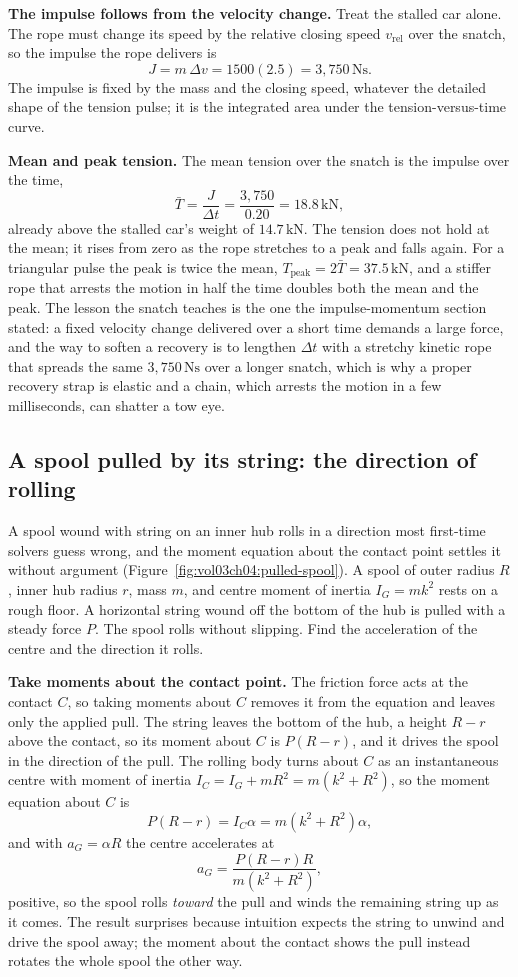 \textbf{The impulse follows from the velocity change.} Treat the stalled
car alone. The rope must change its speed by the relative closing speed
$v_{\text{rel}}$ over the snatch, so the impulse the rope delivers is
\[
J=m\,\Delta v=1500(2.5)=3{,}750\,\si{\newton\second}.
\]
The impulse is fixed by the mass and the closing speed, whatever the
detailed shape of the tension pulse; it is the integrated area under the
tension-versus-time curve.

\textbf{Mean and peak tension.} The mean tension over the snatch is the
impulse over the time,
\[
\bar{T}=\frac{J}{\Delta t}=\frac{3{,}750}{0.20}=18.8\,\si{\kilo\newton},
\]
already above the stalled car's weight of $14.7\,\si{\kilo\newton}$. The
tension does not hold at the mean; it rises from zero as the rope
stretches to a peak and falls again. For a triangular pulse the peak is
twice the mean, $T_{\text{peak}}=2\bar{T}=37.5\,\si{\kilo\newton}$, and a
stiffer rope that arrests the motion in half the time doubles both the
mean and the peak. The lesson the snatch teaches is the one the
impulse-momentum section stated: a fixed velocity change delivered over
a short time demands a large force, and the way to soften a recovery is
to lengthen $\Delta t$ with a stretchy kinetic rope that spreads the same
$3{,}750\,\si{\newton\second}$ over a longer snatch, which is why a
proper recovery strap is elastic and a chain, which arrests the motion in
a few milliseconds, can shatter a tow eye.

\subsection{A spool pulled by its string: the direction of rolling}

A spool wound with string on an inner hub rolls in a direction most
first-time solvers guess wrong, and the moment equation about the
contact point settles it without argument
(Figure~\ref{fig:vol03ch04:pulled-spool}). A spool of outer radius $R$,
inner hub radius $r$, mass $m$, and centre moment of inertia
$I_{G}=mk^{2}$ rests on a rough floor. A horizontal string wound off the
bottom of the hub is pulled with a steady force $P$. The spool rolls
without slipping. Find the acceleration of the centre and the direction
it rolls.

\textbf{Take moments about the contact point.} The friction force acts
at the contact $C$, so taking moments about $C$ removes it from the
equation and leaves only the applied pull. The string leaves the bottom
of the hub, a height $R-r$ above the contact, so its moment about $C$ is
$P(R-r)$, and it drives the spool in the direction of the pull. The
rolling body turns about $C$ as an instantaneous centre with moment of
inertia $I_{C}=I_{G}+mR^{2}=m(k^{2}+R^{2})$, so the moment equation about
$C$ is
\[
P(R-r)=I_{C}\alpha=m(k^{2}+R^{2})\alpha,
\]
and with $a_{G}=\alpha R$ the centre accelerates at
\[
a_{G}=\frac{P(R-r)R}{m(k^{2}+R^{2})},
\]
positive, so the spool rolls \emph{toward} the pull and winds the
remaining string up as it comes. The result surprises because intuition
expects the string to unwind and drive the spool away; the moment about
the contact shows the pull instead rotates the whole spool the other way.

